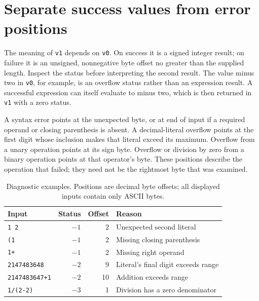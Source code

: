 \section{Separate success values from error positions}\label{expression-results}
The meaning of \texttt{v1} depends on \texttt{v0}. On success it is a signed
integer result; on failure it is an unsigned, nonnegative byte offset no greater
than the supplied length. Inspect the status before interpreting the second result.
The value minus two in \texttt{v0}, for example, is an overflow status rather than
an expression result. A successful expression can itself evaluate to minus two,
which is then returned in \texttt{v1} with a zero status.

A syntax error points at the unexpected byte, or at end of input if a required
operand or closing parenthesis is absent. A decimal-literal overflow points at
the first digit whose inclusion makes that literal exceed its maximum. Overflow
from a unary operation points at its sign byte. Overflow or division by zero from
a binary operation points at that operator's byte. These positions describe the
operation that failed; they need not be the rightmost byte that was examined.

\begin{table}[htbp]
  \centering
  \caption{Diagnostic examples. Positions are decimal byte offsets; all displayed inputs contain only ASCII bytes.}
  \begin{tabular}{lrrl}
    \toprule
    Input                 & Status & Offset & Reason                              \\
    \midrule
    \texttt{1 2}          & $-1$   & 2      & Unexpected second literal           \\
    \texttt{(1}           & $-1$   & 2      & Missing closing parenthesis         \\
    \texttt{1+}           & $-1$   & 2      & Missing right operand               \\
    \texttt{2147483648}   & $-2$   & 9      & Literal's final digit exceeds range \\
    \texttt{2147483647+1} & $-2$   & 10     & Addition exceeds range              \\
    \texttt{1/(2-2)}      & $-3$   & 1      & Division has a zero denominator     \\
    \bottomrule
  \end{tabular}
\end{table}
